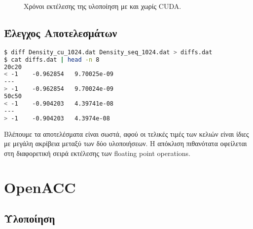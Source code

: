 \documentclass[11pt]{scrartcl} %
\begin{document}
\begin{figure}[H]
    \begin{center}
    \end{center}
    \caption{Χρόνοι εκτέλεσης της υλοποίηση με και χωρίς CUDA.}
    \label{fig:cuda_times}
\end{figure}

\subsection{Έλεγχος Αποτελεσμάτων}

\begin{lstlisting}[language=Bash]
$ diff Density_cu_1024.dat Density_seq_1024.dat > diffs.dat
$ cat diffs.dat | head -n 8
20c20
< -1	-0.962854	9.70025e-09
---
> -1	-0.962854	9.70024e-09
50c50
< -1	-0.904203	4.39741e-08
---
> -1	-0.904203	4.3974e-08
\end{lstlisting}

Βλέπουμε τα αποτελέσματα είναι σωστά, αφού οι τελικές τιμές των κελιών είναι ίδιες με μεγάλη ακρίβεια 
μεταξύ των δύο υλοποιήσεων.
Η απόκλιση πιθανότατα οφείλεται στη διαφορετική σειρά εκτέλεσης των floating point operations.

\section{OpenACC}

\subsection{Υλοποίηση}
\end{document}
